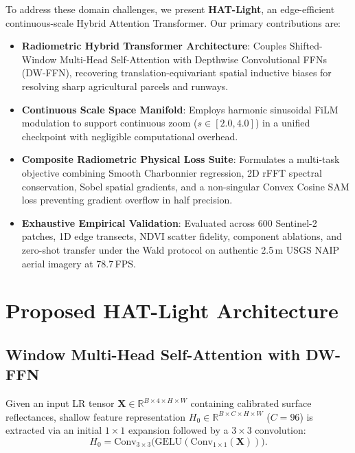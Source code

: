 \documentclass[letterpaper,journal,twoside]{IEEEtran}
\begin{document}
To address these domain challenges, we present \textbf{HAT-Light}, an edge-efficient continuous-scale Hybrid Attention Transformer. Our primary contributions are:
\begin{itemize}[leftmargin=*,itemsep=0.8pt,topsep=1.0pt,parsep=0pt]
    \item \textbf{Radiometric Hybrid Transformer Architecture}: Couples Shifted-Window Multi-Head Self-Attention with Depthwise Convolutional FFNs (DW-FFN), recovering translation-equivariant spatial inductive biases for resolving sharp agricultural parcels and runways.
    \item \textbf{Continuous Scale Space Manifold}: Employs harmonic sinusoidal FiLM modulation \cite{perez2018film,chen2021learning} to support continuous zoom ($s \in [2.0, 4.0]$) in a unified checkpoint with negligible computational overhead.
    \item \textbf{Composite Radiometric Physical Loss Suite}: Formulates a multi-task objective combining Smooth Charbonnier regression, 2D rFFT spectral conservation, Sobel spatial gradients, and a non-singular Convex Cosine SAM loss \cite{kruse1993spectral} preventing gradient overflow in half precision.
    \item \textbf{Exhaustive Empirical Validation}: Evaluated across 600 Sentinel-2 patches, 1D edge transects, NDVI scatter fidelity, component ablations, and zero-shot transfer under the Wald protocol \cite{wald1997fusion} on authentic 2.5\,m USGS NAIP aerial imagery at 78.7\,FPS.
\end{itemize}



\section{Proposed HAT-Light Architecture}

\subsection{Window Multi-Head Self-Attention with DW-FFN}
Given an input LR tensor $\mathbf{X} \in \mathbb{R}^{B \times 4 \times H \times W}$ containing calibrated surface reflectances, shallow feature representation $H_0 \in \mathbb{R}^{B \times C \times H \times W}$ ($C=96$) is extracted via an initial $1 \times 1$ expansion followed by a $3 \times 3$ convolution:
\begin{equation}
H_0 = \text{Conv}_{3\times3}\big(\text{GELU}(\text{Conv}_{1\times1}(\mathbf{X}))\big).
\label{eq:shallow}
\end{equation}
\end{document}
